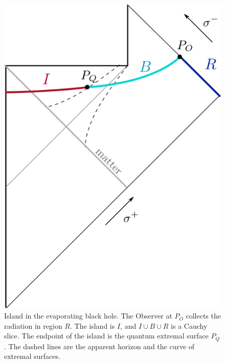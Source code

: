 \documentclass[11pt,oneside,letterpaper]{article}
\numberwithin{equation}{section}
\begin{document}
\begin{figure}
\begin{center}
\includegraphics[scale=0.8]{figures/evap-big.png}
\end{center}
\caption{\small Island in the evaporating black hole. The Observer at $P_O$ collects the radiation in region $R$. The island is $I$, and $I \cup B \cup R$ is a Cauchy slice. The endpoint of the island is the quantum extremal surface $P_Q$. The dashed lines are the apparent horizon and the curve of extremal surfaces. \label{fig:evap-big}}
\end{figure}
\end{document}
